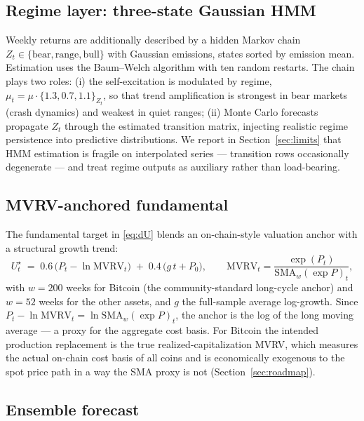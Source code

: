 \documentclass[11pt,a4paper]{article}
\begin{document}
\subsection{Regime layer: three-state Gaussian HMM}\label{sec:hmm}

Weekly returns are additionally described by a hidden Markov chain $Z_t \in \{\text{bear},\text{range},\text{bull}\}$ with Gaussian emissions, states sorted by emission mean. Estimation uses the Baum--Welch algorithm with ten random restarts. The chain plays two roles: (i) the self-excitation is modulated by regime, $\mu_t = \mu \cdot \{1.3, 0.7, 1.1\}_{Z_t}$, so that trend amplification is strongest in bear markets (crash dynamics) and weakest in quiet ranges; (ii) Monte Carlo forecasts propagate $Z_t$ through the estimated transition matrix, injecting realistic regime persistence into predictive distributions. We report in Section~\ref{sec:limits} that HMM estimation is fragile on interpolated series --- transition rows occasionally degenerate --- and treat regime outputs as auxiliary rather than load-bearing.

\subsection{MVRV-anchored fundamental}\label{sec:mvrv}

The fundamental target in \eqref{eq:dU} blends an on-chain-style valuation anchor with a structural growth trend:
\begin{equation}
U^{\star}_t \;=\; 0.6 \,\big(P_t - \ln \mathrm{MVRV}_t\big) \;+\; 0.4\,\big(g\,t + P_0\big),
\qquad
\mathrm{MVRV}_t = \frac{\exp(P_t)}{\mathrm{SMA}_{w}(\exp P)_t},
\label{eq:ustar}
\end{equation}
with $w = 200$ weeks for Bitcoin (the community-standard long-cycle anchor) and $w = 52$ weeks for the other assets, and $g$ the full-sample average log-growth. Since $P_t - \ln\mathrm{MVRV}_t = \ln \mathrm{SMA}_w(\exp P)_t$, the anchor is the log of the long moving average --- a proxy for the aggregate cost basis. For Bitcoin the intended production replacement is the true realized-capitalization MVRV, which measures the actual on-chain cost basis of all coins and is economically exogenous to the spot price path in a way the SMA proxy is not (Section~\ref{sec:roadmap}).

\subsection{Ensemble forecast}\label{sec:ensemble}
\end{document}
